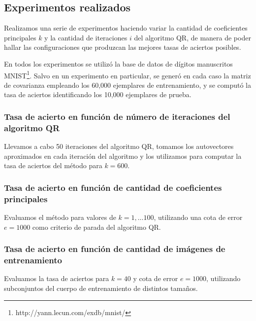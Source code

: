 \documentclass[a4paper,10pt,twoside]{article}
\begin{document}
\subsection{Experimentos realizados}

Realizamos una serie de experimentos haciendo variar la cantidad de coeficientes principales $k$ y la cantidad de iteraciones $i$ del algoritmo QR, de manera de poder hallar las configuraciones que produzcan las mejores tasas de aciertos posibles.

En todos los experimentos se utilizó la base de datos de dígitos manuscritos MNIST\footnote{http://yann.lecun.com/exdb/mnist/}. Salvo en un experimento en particular, se generó en cada caso la matriz de covarianza empleando los 60,000 ejemplares de entrenamiento, y se computó la tasa de aciertos identificando los 10,000 ejemplares de prueba.


\subsubsection{Tasa de acierto en función de número de iteraciones del algoritmo QR}

Llevamos a cabo 50 iteraciones del algoritmo QR, tomamos los autovectores aproximados en cada iteración del algoritmo y los utilizamos para computar la tasa de aciertos del método para $k = 600$.


\subsubsection{Tasa de acierto en función de cantidad de coeficientes principales}

Evaluamos el método para valores de $k = 1, \ldots 100$, utilizando una cota de error $e = 1000$ como criterio de parada del algoritmo QR.


\subsubsection{Tasa de acierto en función de cantidad de imágenes de entrenamiento}

Evaluamos la tasa de aciertos para $k = 40$ y cota de error $e = 1000$, utilizando subconjuntos del cuerpo de entrenamiento de distintos tamaños.


\end{document}
